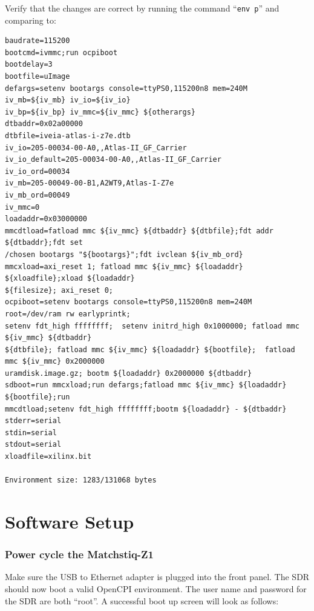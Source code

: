\begin{flushleft}
Verify that the changes are correct by running the command ``\texttt{env p}'' and comparing to:
\end{flushleft}
\begin{verbatim}
baudrate=115200
bootcmd=ivmmc;run ocpiboot
bootdelay=3
bootfile=uImage
defargs=setenv bootargs console=ttyPS0,115200n8 mem=240M iv_mb=${iv_mb} iv_io=${iv_io}
iv_bp=${iv_bp} iv_mmc=${iv_mmc} ${otherargs}
dtbaddr=0x02a00000
dtbfile=iveia-atlas-i-z7e.dtb
iv_io=205-00034-00-A0,,Atlas-II_GF_Carrier
iv_io_default=205-00034-00-A0,,Atlas-II_GF_Carrier
iv_io_ord=00034
iv_mb=205-00049-00-B1,A2WT9,Atlas-I-Z7e
iv_mb_ord=00049
iv_mmc=0
loadaddr=0x03000000
mmcdtload=fatload mmc ${iv_mmc} ${dtbaddr} ${dtbfile};fdt addr ${dtbaddr};fdt set
/chosen bootargs "${bootargs}";fdt ivclean ${iv_mb_ord}
mmcxload=axi_reset 1; fatload mmc ${iv_mmc} ${loadaddr} ${xloadfile};xload ${loadaddr}
${filesize}; axi_reset 0;
ocpiboot=setenv bootargs console=ttyPS0,115200n8 mem=240M root=/dev/ram rw earlyprintk;
setenv fdt_high ffffffff;  setenv initrd_high 0x1000000; fatload mmc ${iv_mmc} ${dtbaddr}
${dtbfile}; fatload mmc ${iv_mmc} ${loadaddr} ${bootfile};  fatload mmc ${iv_mmc} 0x2000000
uramdisk.image.gz; bootm ${loadaddr} 0x2000000 ${dtbaddr}
sdboot=run mmcxload;run defargs;fatload mmc ${iv_mmc} ${loadaddr} ${bootfile};run
mmcdtload;setenv fdt_high ffffffff;bootm ${loadaddr} - ${dtbaddr}
stderr=serial
stdin=serial
stdout=serial
xloadfile=xilinx.bit

Environment size: 1283/131068 bytes
\end{verbatim}

\section{Software Setup}

%
\subsubsection*{Power cycle the Matchstiq-Z1}
Make sure the USB to Ethernet adapter is plugged into the front panel. The SDR should now boot a valid OpenCPI environment.  The user name and password for the SDR are both ``root''.  A successful boot up screen will look as follows:

